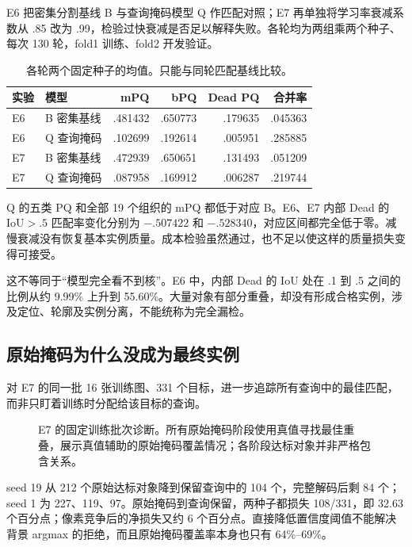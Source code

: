 \documentclass[UTF8,zihao=-4,fontset=windows]{ctexart}
\begin{document}
E6 把密集分割基线 B 与查询掩码模型 Q 作匹配对照；E7 再单独将学习率衰减系数从 .85 改为 .99，检验过快衰减是否足以解释失败。各轮均为两组乘两个种子、每次 130 轮，fold1 训练、fold2 开发验证。

\begin{table}[H]\centering\small
\begin{tabular}{llrrrr}\toprule
实验 & 模型 & mPQ & bPQ & Dead PQ & 合并率\\\midrule
E6 & B 密集基线 & .481432 & .650773 & .179635 & .045363\\
E6 & Q 查询掩码 & .102699 & .192614 & .005951 & .285885\\
E7 & B 密集基线 & .472939 & .650651 & .131493 & .051209\\
E7 & Q 查询掩码 & .087958 & .169912 & .006287 & .219744\\\bottomrule
\end{tabular}
\caption{各轮两个固定种子的均值。只能与同轮匹配基线比较。}
\end{table}

Q 的五类 PQ 和全部 19 个组织的 mPQ 都低于对应 B。E6、E7 内部 Dead 的 IoU$>.5$ 匹配率变化分别为 $-.507422$ 和 $-.528340$，对应区间都完全低于零。减慢衰减没有恢复基本实例质量。成本检验虽然通过，也不足以使这样的质量损失变得可接受。

这不等同于“模型完全看不到核”。E6 中，内部 Dead 的 IoU 处在 .1 到 .5 之间的比例从约 9.99\% 上升到 55.60\%。大量对象有部分重叠，却没有形成合格实例，涉及定位、轮廓及实例分离，不能统称为完全漏检。

\subsection{原始掩码为什么没成为最终实例}

对 E7 的同一批 16 张训练图、331 个目标，进一步追踪所有查询中的最佳匹配，而非只盯着训练时分配给该目标的查询。

\begin{figure}[H]\centering
\caption{E7 的固定训练批次诊断。所有原始掩码阶段使用真值寻找最佳重叠，展示真值辅助的原始掩码覆盖情况；各阶段达标对象并非严格包含关系。}
\end{figure}

seed 19 从 212 个原始达标对象降到保留查询中的 104 个，完整解码后剩 84 个；seed 1 为 227、119、97。原始掩码到查询保留，两种子都损失 108/331，即 32.63 个百分点；像素竞争后的净损失又约 6 个百分点。直接降低置信度阈值不能解决背景 argmax 的拒绝，而且原始掩码覆盖率本身也只有 64\%--69\%。
\end{document}
